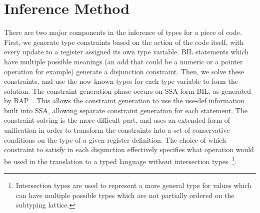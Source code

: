 \section{Inference Method}
\label{sec:infmeth}
There are two major components in the inference of types for a piece of code. First, we generate type constraints based on the action of the code itself, with every update to a register assigned its own type variable. BIL statements which have multiple possible meanings (an add that could be a numeric or a pointer operation for example) generate a disjunction constraint. Then, we solve these constraints, and use the now-known types for each type variable to form the solution. The constraint generation phase occurs on SSA-form BIL, as generated by BAP~\cite{bap}.
This allows the constraint generation to use the use-def information built into SSA, allowing separate constraint generation for each statement.
The constraint solving is the more difficult part, and uses an extended form of unification in order to transform the constraints into a set of conservative conditions on the type of a given register definition. The choice of which constraint to satisfy in each disjunction effectively specifies what operation would be used in the translation to a typed language without intersection types~\cite{Jim1995,Shao1993}\footnote{
	Intersection types are used to represent a more general type for values which can have multiple possible types which are not partially ordered on the subtyping lattice.
}.



